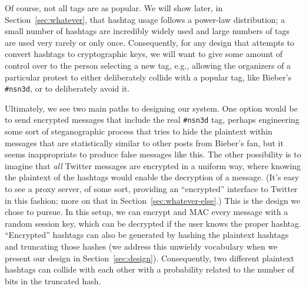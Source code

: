 Of course, not all tags are as popular. We will show later, in  Section~\ref{sec:whatever}, that hashtag usage follows a power-law distribution; a small number of hashtags are incredibly widely used and large numbers of tags are used very rarely or only once. Consequently, for any design that attempts to convert hashtags to cryptographic keys, we will want to give some amount of control over to the person selecting a new tag, e.g., allowing the organizers of a particular protest to either deliberately collide with a popular tag, like Bieber's {\tt \#nsn3d}, or to deliberately avoid it.

Ultimately, we see two main paths to designing our system. One option would be to send encrypted messages that include the real {\tt \#nsn3d} tag, perhaps engineering some sort of steganographic process that tries to hide the plaintext within messages that are statistically similar to other posts from Bieber's fan, but it seems inappropriate to produce false messages like this. The other possibility is to imagine that {\em all} Twitter messages are encrypted in a uniform way, where knowing the plaintext of the hashtags would enable the decryption of a message. (It's easy to see a proxy server, of some sort, providing an ``encrypted'' interface to Twitter in this fashion; more on that in Section~\ref{sec:whatever-else}.) This is the design we chose to pursue. In this setup, we can encrypt and MAC every message with a random session key, which can be decrypted if the user knows the proper hashtag. ``Encrypted'' hashtags can also be generated by hashing the plaintext hashtags and truncating those hashes (we address this unwieldy vocabulary when we present our design in Section~\ref{sec:design}). Consequently, two different plaintext hashtags can collide with each other with a probability related to the number of bits in the truncated hash.

